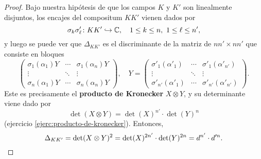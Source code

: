 \begin{proposicion}
\begin{proof}
    Bajo nuestra hipótesis de que los campos $K$ y $K'$ son linealmente disjuntos,
    los encajes del compositum $K K'$ vienen dados por
    \[ \sigma_k \sigma'_\ell\colon K K' \hookrightarrow \mathbb{C}, \quad
       1 \le k \le n, ~ 1 \le \ell \le n', \]
    y luego se puede ver que $\Delta_{K K'}$ es el discriminante de la matriz
    de $nn'\times nn'$ que consiste en bloques
    \[ \begin{pmatrix}
      \sigma_1 (\alpha_1) Y & \cdots & \sigma_1 (\alpha_n) Y \\
      \vdots & \ddots & \vdots \\
      \sigma_n (\alpha_1) Y & \cdots & \sigma_n (\alpha_n) Y
    \end{pmatrix}, \quad
    Y = \begin{pmatrix}
      \sigma'_1 (\alpha'_1) & \cdots & \sigma'_1 (\alpha'_{n'}) \\
      \vdots & \ddots & \vdots \\
      \sigma'_{n'} (\alpha'_1) & \cdots & \sigma'_{n'} (\alpha'_{n'})
    \end{pmatrix}. \]
    Este es precisamente el \textbf{producto de Kronecker} $X\otimes Y$,
    y su determinante viene dado por
    $$\det (X\otimes Y) = \det (X)^{n'} \cdot \det (Y)^n$$
    (ejercicio \ref{ejerc:producto-de-kronecker}). Entonces,
    \[ \Delta_{K K'} = \det (X \otimes Y)^2
       = \det (X)^{2n'} \cdot \det (Y)^{2n} = d^{n'}\cdot d'^n. \qedhere \]
  \end{proof}
\end{proposicion}

